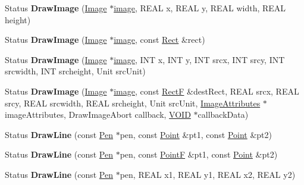 \begin{DoxyCompactItemize}
\item 
\mbox{\label{class_graphics_aae613c176263aeef5885e2153025660b}} 
Status {\bfseries Draw\+Image} (\hyperlink{class_image}{Image} $\ast$\hyperlink{interfacevoid}{image}, R\+E\+AL x, R\+E\+AL y, R\+E\+AL width, R\+E\+AL height)
\item 
\mbox{\label{class_graphics_ab97bb65fbaaf0d075c3d69c685f2ecfe}} 
Status {\bfseries Draw\+Image} (\hyperlink{class_image}{Image} $\ast$\hyperlink{interfacevoid}{image}, const \hyperlink{struct_rect}{Rect} \&rect)
\item 
\mbox{\label{class_graphics_a1fe3d8557ea2804e9818a304538a0028}} 
Status {\bfseries Draw\+Image} (\hyperlink{class_image}{Image} $\ast$\hyperlink{interfacevoid}{image}, I\+NT x, I\+NT y, I\+NT srcx, I\+NT srcy, I\+NT srcwidth, I\+NT srcheight, Unit src\+Unit)
\item 
\mbox{\label{class_graphics_a6284b9dbc786f20a0247634fbbabad91}} 
Status {\bfseries Draw\+Image} (\hyperlink{class_image}{Image} $\ast$\hyperlink{interfacevoid}{image}, const \hyperlink{struct_rect_f}{RectF} \&dest\+Rect, R\+E\+AL srcx, R\+E\+AL srcy, R\+E\+AL srcwidth, R\+E\+AL srcheight, Unit src\+Unit, \hyperlink{class_image_attributes}{Image\+Attributes} $\ast$image\+Attributes, Draw\+Image\+Abort callback, \hyperlink{interfacevoid}{V\+O\+ID} $\ast$callback\+Data)
\item 
\mbox{\label{class_graphics_ac8e715c1cf23cbbc4ccbac54f2c09d98}} 
Status {\bfseries Draw\+Line} (const \hyperlink{class_pen}{Pen} $\ast$pen, const \hyperlink{struct_point}{Point} \&pt1, const \hyperlink{struct_point}{Point} \&pt2)
\item 
\mbox{\label{class_graphics_a1500bd09eee1bb5e7e875e65cf17fd5b}} 
Status {\bfseries Draw\+Line} (const \hyperlink{class_pen}{Pen} $\ast$pen, const \hyperlink{struct_point_f}{PointF} \&pt1, const \hyperlink{struct_point}{Point} \&pt2)
\item 
\mbox{\label{class_graphics_a559202e44ec74b5933f4d0b6364aa12b}} 
Status {\bfseries Draw\+Line} (const \hyperlink{class_pen}{Pen} $\ast$pen, R\+E\+AL x1, R\+E\+AL y1, R\+E\+AL x2, R\+E\+AL y2)
\item 

\end{DoxyCompactItemize}
